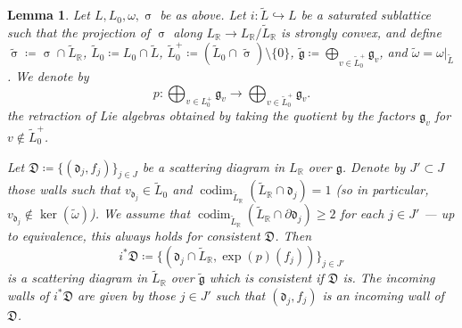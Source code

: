 \documentclass{amsart}
\DeclareMathOperator{\codim}{codim}
\let\bb=\mathbb
\let\f=\mathfrak
\let\wt=\widetilde
\renewcommand{\sigma}{\upsigma}
\theoremstyle{plain}%
\newtheorem{lem}[thm]{Lemma}
\theoremstyle{definition}
\theoremstyle{remark}
\begin{document}
\begin{lem}
\label{RestrictScat}
Let $L,L_0,\omega,\sigma$ be as above.  Let $i\colon \wt{L}\hookrightarrow L$ be a saturated sublattice such that the projection of $\sigma$ along $L_{\bb{R}}\rightarrow L_{\bb{R}}/\wt{L}_{\bb{R}}$ is strongly convex, and define $\wt{\sigma}\coloneqq \sigma\cap \wt{L}_{\bb{R}}$, $\wt{L}_0\coloneqq L_0\cap \wt{L}$, $\wt{L}_0^+\coloneqq (\wt{L}_0\cap \wt{\sigma})\setminus \{0\}$, $\wt{\f{g}}\coloneqq \bigoplus_{v\in \wt{L}_0^{+}}\f{g}_v$,  and $\wt{\omega}=\omega\lvert_{\wt{L}}$.  We denote by
\[
p\colon \bigoplus_{v\in L_0^+}\f{g}_v\rightarrow \bigoplus_{v\in \wt{L}_0^+}\f{g}_v.
\]
the retraction of Lie algebras obtained by taking the quotient by the factors $\f{g}_v$ for $v\notin \wt{L}_0^+$.

Let $\f{D}\coloneqq \{(\f{d}_j,f_{j})\}_{j\in J}$ be a scattering diagram in $L_{\bb{R}}$ over $\f{g}$.  Denote by $J'\subset J$ those walls such that $v_{\f{d}_j}\in \wt{L}_0$ and $\codim_{\wt{L}_{\bb{R}}}(\wt{L}_{\bb{R}}\cap \f{d}_j) = 1$ (so in particular, $v_{\f{d}_j}\notin  \ker(\wt{\omega})$). We assume that $\codim_{\wt{L}_{\bb{R}}}(\wt{L}_{\bb{R}}\cap \partial \f{d}_j) \geq 2$ for each $j\in J'$ --- up to equivalence, this always holds for consistent $\f{D}$. Then
\[
i^*\f{D}\coloneqq \{(\f{d}_j\cap \wt{L}_{\bb{R}},\exp(p)(f_{j}))\}_{j\in J'}
\]
is a scattering diagram in $\wt{L}_{\bb{R}}$ over $\wt{\f{g}}$ which is consistent if $\f{D}$ is.  The incoming walls of $i^*\f{D}$ are given by those $j\in J'$ such that $(\f{d}_j,f_j)$ is an incoming wall of $\f{D}$.
\end{lem}
\end{document}
